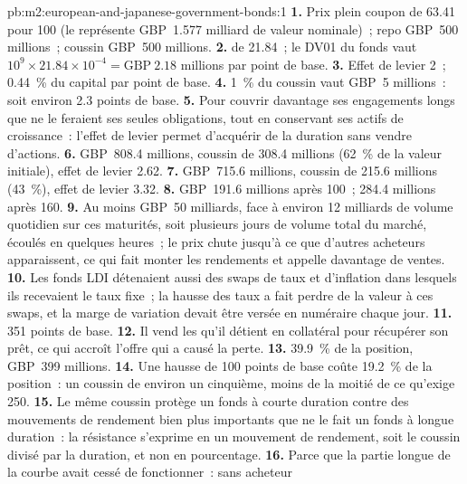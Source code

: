 \begin{solution}{pb:m2:european-and-japanese-government-bonds:1}
\textbf{1.} Prix plein coupon de 63.41 pour 100 (le  représente GBP~1.577 milliard de valeur nominale)~;
repo GBP~500 millions~; coussin GBP~500 millions.
\textbf{2.}  de 21.84~; le DV01 du fonds vaut $10^9 \times 21.84 \times
10^{-4} = \text{GBP}~2.18$ millions par point de base.
\textbf{3.} Effet de levier 2~; 0.44~\% du capital par point de base.
\textbf{4.} 1~\% du coussin vaut GBP~5 millions~: soit environ 2.3 points de base.
\textbf{5.} Pour couvrir davantage ses engagements longs que ne le feraient ses seules
obligations, tout en conservant ses actifs de croissance~: l'effet de levier permet d'acquérir de la duration sans vendre
d'actions.
\textbf{6.}  GBP~808.4 millions, coussin de 308.4 millions (62~\% de la
valeur initiale), effet de levier 2.62.
\textbf{7.}  GBP~715.6 millions, coussin de 215.6 millions (43~\%), effet de levier 3.32.
\textbf{8.} GBP~191.6 millions après 100~; 284.4 millions après 160.
\textbf{9.} Au moins GBP~50 milliards, face à environ 12 milliards de volume quotidien sur
ces maturités, soit plusieurs jours de volume total du marché, écoulés en quelques heures~; le
prix chute jusqu'à ce que d'autres acheteurs apparaissent, ce qui fait monter les rendements et appelle
davantage de ventes.
\textbf{10.} Les fonds LDI détenaient aussi des swaps de taux et d'inflation dans lesquels
ils recevaient le taux fixe~; la hausse des taux a fait perdre de la valeur à ces swaps, et la
marge de variation devait être versée en numéraire chaque jour.
\textbf{11.} 351 points de base.
\textbf{12.} Il vend les  qu'il détient en collatéral pour récupérer son prêt,
ce qui accroît l'offre qui a causé la perte.
\textbf{13.} 39.9~\% de la position, GBP~399 millions.
\textbf{14.} Une hausse de 100 points de base coûte 19.2~\% de la position~: un coussin de
environ un cinquième, moins de la moitié de ce qu'exige 250.
\textbf{15.} Le même coussin protège un fonds à courte duration contre des mouvements de rendement bien plus importants
que ne le fait un fonds à longue duration~: la résistance s'exprime en un mouvement de rendement, soit le coussin divisé par
la duration, et non en pourcentage.
\textbf{16.} Parce que la partie longue de la courbe avait cessé de fonctionner~: sans acheteur

\end{solution}
